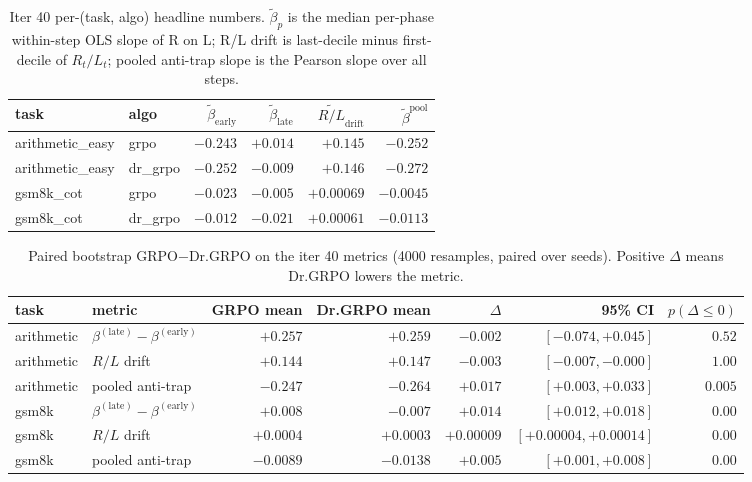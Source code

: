 \documentclass{article}
\begin{document}
\begin{table}[t]
\centering
\small
\caption{Iter 40 per-(task, algo) headline numbers. $\tilde\beta_p$ is
the median per-phase within-step OLS slope of R on L; R/L drift is
last-decile minus first-decile of $R_t/L_t$; pooled anti-trap slope
is the Pearson slope over all steps.}
\label{tab:length-iter40-summary}
\begin{tabular}{llrrrr}
\toprule
task & algo & $\tilde\beta_{\mathrm{early}}$ & $\tilde\beta_{\mathrm{late}}$ &
$\widetilde{R/L}_{\mathrm{drift}}$ & $\tilde\beta^{\mathrm{pool}}$ \\
\midrule
arithmetic\_easy & grpo    & $-0.243$ & $+0.014$ & $+0.145$ & $-0.252$ \\
arithmetic\_easy & dr\_grpo & $-0.252$ & $-0.009$ & $+0.146$ & $-0.272$ \\
gsm8k\_cot       & grpo    & $-0.023$ & $-0.005$ & $+0.00069$ & $-0.0045$ \\
gsm8k\_cot       & dr\_grpo & $-0.012$ & $-0.021$ & $+0.00061$ & $-0.0113$ \\
\bottomrule
\end{tabular}
\end{table}

\begin{table}[t]
\centering
\small
\caption{Paired bootstrap GRPO$-$Dr.GRPO on the iter 40 metrics
(4000 resamples, paired over seeds).  Positive $\Delta$ means
Dr.GRPO lowers the metric.}
\label{tab:length-iter40-cross}
\begin{tabular}{llrrrrr}
\toprule
task & metric & GRPO mean & Dr.GRPO mean & $\Delta$ & 95\% CI & $p(\Delta\le 0)$ \\
\midrule
arithmetic & $\beta^{(\mathrm{late})}{}-\beta^{(\mathrm{early})}$ & $+0.257$ & $+0.259$ & $-0.002$ & $[-0.074, +0.045]$ & $0.52$ \\
arithmetic & $R/L$ drift & $+0.144$ & $+0.147$ & $-0.003$ & $[-0.007, -0.000]$ & $1.00$ \\
arithmetic & pooled anti-trap & $-0.247$ & $-0.264$ & $+0.017$ & $[+0.003, +0.033]$ & $0.005$ \\
gsm8k & $\beta^{(\mathrm{late})}{}-\beta^{(\mathrm{early})}$ & $+0.008$ & $-0.007$ & $+0.014$ & $[+0.012, +0.018]$ & $0.00$ \\
gsm8k & $R/L$ drift & $+0.0004$ & $+0.0003$ & $+0.00009$ & $[+0.00004, +0.00014]$ & $0.00$ \\
gsm8k & pooled anti-trap & $-0.0089$ & $-0.0138$ & $+0.005$ & $[+0.001, +0.008]$ & $0.00$ \\
\bottomrule
\end{tabular}
\end{table}
\end{document}
